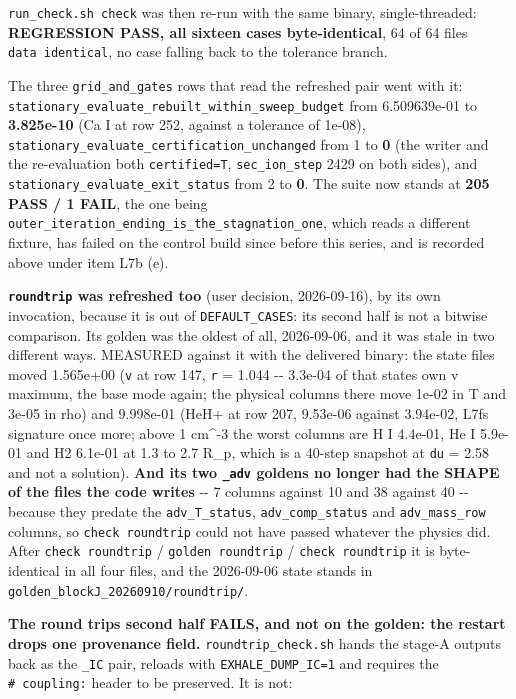 \documentclass[english,a4paper]{my_memo}
\begin{document}
\texttt{run\_check.sh\ check} was then re-run with the same binary, single-threaded:
\textbf{REGRESSION PASS, all sixteen cases byte-identical}, 64 of 64 files
\texttt{data\ identical}, no case falling back to the tolerance branch.

The three \texttt{grid\_and\_gates} rows that read the refreshed pair went with it:
\texttt{stationary\_evaluate\_rebuilt\_within\_sweep\_budget} from 6.509639e-01 to
\textbf{3.825e-10} (Ca I at row 252, against a tolerance of 1e-08),
\texttt{stationary\_evaluate\_certification\_unchanged} from 1 to \textbf{0} (the writer and
the re-evaluation both \texttt{certified=T}, \texttt{sec\_ion\_step} 2429 on both sides), and
\texttt{stationary\_evaluate\_exit\_status} from 2 to \textbf{0}. The suite now stands at
\textbf{205 PASS / 1 FAIL}, the one being
\texttt{outer\_iteration\_ending\_is\_the\_stagnation\_one}, which reads a different
fixture, has failed on the control build since before this series, and is
recorded above under item L7b (e).

\textbf{\texttt{roundtrip} was refreshed too} (user decision, 2026-09-16), by its own
invocation, because it is out of \texttt{DEFAULT\_CASES}: its second half is not a
bitwise comparison. Its golden was the oldest of all, 2026-09-06, and it was
stale in two different ways. MEASURED against it with the delivered binary:
the state files moved 1.565e+00 (\texttt{v} at row 147, \texttt{r} = 1.044 -\/- 3.3e-04 of that
state\textquotesingle s own \textbar v\textbar{} maximum, the base mode again; the physical columns there move
1e-02 in T and 3e-05 in rho) and 9.998e-01 (HeH+ at row 207, 9.53e-06 against
3.94e-02, L7f\textquotesingle s signature once more; above 1 cm\^{}-3 the worst columns are H I
4.4e-01, He I 5.9e-01 and H2 6.1e-01 at 1.3 to 2.7 R\_p, which is a 40-step
snapshot at \texttt{du} = 2.58 and not a solution). \textbf{And its two \texttt{\_adv} goldens no
longer had the SHAPE of the files the code writes} -\/- 7 columns against 10 and
38 against 40 -\/- because they predate the \texttt{adv\_T\_status}, \texttt{adv\_comp\_status} and
\texttt{adv\_mass\_row} columns, so \texttt{check\ roundtrip} could not have passed whatever the
physics did. After \texttt{check\ roundtrip} / \texttt{golden\ roundtrip} / \texttt{check\ roundtrip}
it is byte-identical in all four files, and the 2026-09-06 state stands in
\texttt{golden\_blockJ\_20260910/roundtrip/}.

\textbf{The round trip\textquotesingle s second half FAILS, and not on the golden: the restart drops
one provenance field.} \texttt{roundtrip\_check.sh} hands the stage-A outputs back as
the \texttt{\_IC} pair, reloads with \texttt{EXHALE\_DUMP\_IC=1} and requires the \texttt{\#\ coupling:}
header to be preserved. It is not:
\end{document}
